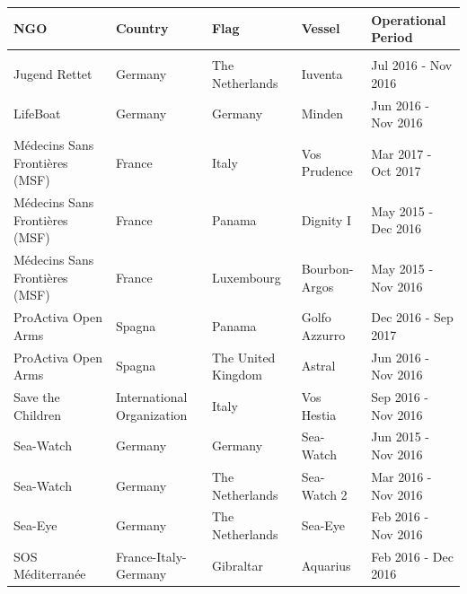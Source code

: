\begin{tabular}{L{5.5cm}L{5cm}L{4cm}L{3cm}L{4cm}}
\toprule\toprule
NGO                           & Country                    & Flag               & Vessel        & Operational Period               \\
\hline
&&&& \\
Jugend Rettet                  & Germany                    & The Netherlands    & Iuventa       & Jul 2016 - Nov 2016 \\
LifeBoat                       & Germany                    & Germany            & Minden        & Jun 2016 - Nov 2016 \\
Médecins Sans Frontières (MSF) & France                     & Italy              & Vos Prudence  & Mar 2017 - Oct 2017 \\
Médecins Sans Frontières (MSF) & France                     & Panama             & Dignity I     & May 2015 - Dec 2016 \\
Médecins Sans Frontières (MSF) & France                     & Luxembourg         & Bourbon-Argos & May 2015 - Nov 2016 \\
ProActiva Open Arms            & Spagna                     & Panama             & Golfo Azzurro & Dec 2016 - Sep 2017  \\
ProActiva Open Arms            & Spagna                     & The United Kingdom & Astral        & Jun 2016 - Nov 2016 \\
Save the Children              & International Organization & Italy              & Vos Hestia    & Sep 2016 - Nov 2016 \\
Sea-Watch                      & Germany                    & Germany            & Sea-Watch     & Jun 2015 - Nov 2016 \\
Sea-Watch                      & Germany                    & The Netherlands    & Sea-Watch 2   & Mar 2016 - Nov 2016 \\
Sea-Eye                        & Germany                    & The Netherlands    & Sea-Eye       & Feb 2016 - Nov 2016 \\
SOS Méditerranée               & France-Italy-Germany       & Gibraltar          & Aquarius      & Feb 2016 - Dec 2016 \\
\bottomrule\bottomrule
\end{tabular}%
